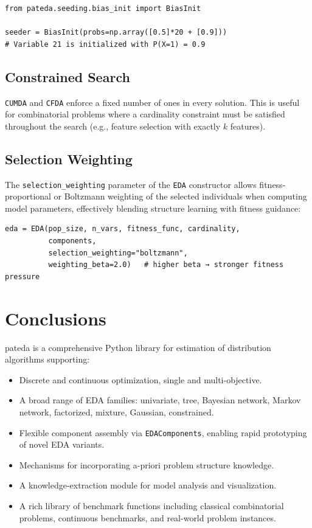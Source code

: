 \documentclass[a4paper,11pt]{article}
\begin{document}
\begin{lstlisting}
from pateda.seeding.bias_init import BiasInit

seeder = BiasInit(probs=np.array([0.5]*20 + [0.9]))
# Variable 21 is initialized with P(X=1) = 0.9
\end{lstlisting}

\subsection{Constrained Search}

\texttt{CUMDA} and \texttt{CFDA} enforce a fixed number of ones in every
solution.  This is useful for combinatorial problems where a cardinality
constraint must be satisfied throughout the search (e.g., feature selection
with exactly $k$ features).

\subsection{Selection Weighting}

The \texttt{selection\_weighting} parameter of the \texttt{EDA} constructor
allows fitness-proportional or Boltzmann weighting of the selected individuals
when computing model parameters, effectively blending structure learning with
fitness guidance:

\begin{lstlisting}
eda = EDA(pop_size, n_vars, fitness_func, cardinality,
          components,
          selection_weighting="boltzmann",
          weighting_beta=2.0)   # higher beta → stronger fitness pressure
\end{lstlisting}

\section{Conclusions}

pateda is a comprehensive Python library for estimation of distribution
algorithms supporting:

\begin{itemize}
  \item Discrete and continuous optimization, single and multi-objective.
  \item A broad range of EDA families: univariate, tree, Bayesian network,
    Markov network, factorized, mixture, Gaussian, constrained.
  \item Flexible component assembly via \texttt{EDAComponents}, enabling
    rapid prototyping of novel EDA variants.
  \item Mechanisms for incorporating a-priori problem structure knowledge.
  \item A knowledge-extraction module for model analysis and visualization.
  \item A rich library of benchmark functions including classical combinatorial
    problems, continuous benchmarks, and real-world problem instances.
\end{itemize}
\end{document}
